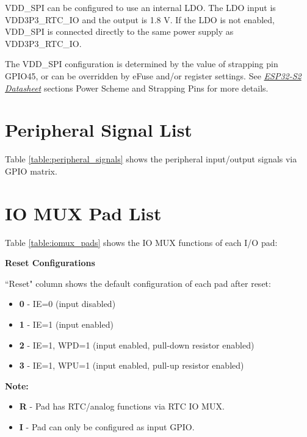 \documentclass[main\_\_EN.tex]{subfiles}
\begin{document}
VDD\_SPI can be configured to use an internal LDO. The LDO input is VDD3P3\_RTC\_IO and the output is 1.8 V. If the LDO is not enabled, VDD\_SPI is connected directly to the same power supply as VDD3P3\_RTC\_IO.

The VDD\_SPI configuration is determined by the value of strapping pin GPIO45, or can be overridden by eFuse and/or register settings. See {\it{\href{https://www.espressif.com/sites/default/files/documentation/esp32-s2_datasheet_en.pdf}{ESP32-S2 Datasheet}}} sections Power Scheme and Strapping Pins for more details.


\section{Peripheral Signal List}
\label{sec:peripheral_signals}

Table \ref{table:peripheral_signals} shows the peripheral input/output signals via GPIO matrix.



\section{IO MUX Pad List}
\label{sec:iomux_pads}
Table  \ref{table:iomux_pads} shows the IO MUX functions of each I/O pad:



\textbf{Reset Configurations}

``Reset" column shows the default configuration of each pad after reset:

\begin{itemize}
\item \textbf{0} - IE=0 (input disabled)
\item \textbf{1} - IE=1 (input enabled)
\item \textbf{2} - IE=1, WPD=1 (input enabled, pull-down resistor enabled)
\item \textbf{3} - IE=1, WPU=1 (input enabled, pull-up resistor enabled)
\end{itemize}

\textbf{Note:}

\begin{itemize}
\item \textbf{R} - Pad has RTC/analog functions via RTC IO MUX.
\item \textbf{I} - Pad can only be configured as input GPIO.
\end{itemize}
\end{document}
